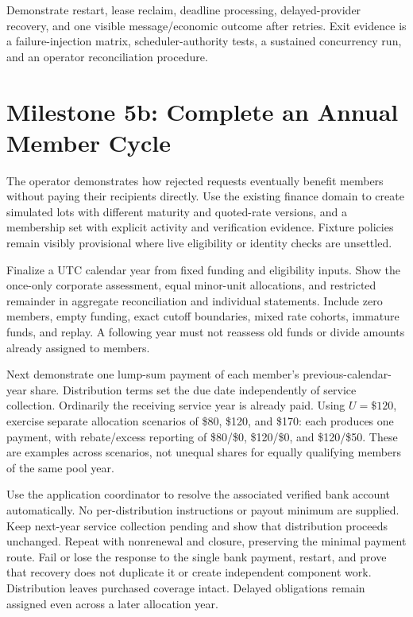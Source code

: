 \documentclass[11pt]{article}
\begin{document}
Demonstrate restart, lease reclaim, deadline processing, delayed-provider recovery,
and one visible message/economic outcome after retries. Exit evidence is a
failure-injection matrix, scheduler-authority tests, a sustained concurrency run,
and an operator reconciliation procedure.

\section{Milestone 5b: Complete an Annual Member Cycle}

The operator demonstrates how rejected requests eventually benefit members
without paying their recipients directly. Use the existing finance domain to
create simulated lots with different maturity and quoted-rate versions, and a
membership set with explicit activity and verification evidence. Fixture policies
remain visibly provisional where live eligibility or identity checks are unsettled.

Finalize a UTC calendar year from fixed funding and eligibility inputs. Show the
once-only corporate assessment, equal minor-unit allocations, and restricted
remainder in aggregate reconciliation and individual statements. Include zero
members, empty funding, exact cutoff boundaries, mixed rate cohorts, immature
funds, and replay. A following year must not reassess old funds or divide amounts
already assigned to members.

Next demonstrate one lump-sum payment of each member's previous-calendar-year
share. Distribution terms set the due date independently of service collection.
Ordinarily the receiving service year is already paid. Using $U=\$120$,
exercise separate allocation scenarios of \$80, \$120, and \$170: each produces
one payment, with rebate/excess reporting of \$80/\$0, \$120/\$0, and
\$120/\$50. These are examples across scenarios, not unequal shares for equally
qualifying members of the same pool year.

Use the application coordinator to resolve the associated verified bank account
automatically. No per-distribution instructions or payout minimum are supplied.
Keep next-year service collection pending and show that distribution proceeds
unchanged. Repeat with nonrenewal and closure, preserving the minimal payment
route. Fail or lose the response to the single bank payment, restart, and prove
that recovery does not duplicate it or create independent component work.
Distribution leaves purchased coverage intact. Delayed obligations remain
assigned even across a later allocation year.
\end{document}
